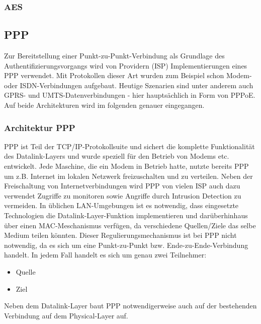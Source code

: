  
 \subsubsection{AES}
 \label{aes}
 
 \cite{paar09}
 
 \clearpage

\subsection{PPP}
Zur Bereitstellung einer Punkt-zu-Punkt-Verbindung als Grundlage des Authentifizierungsvorgangs
wird von Providern (\ac{ISP}) Implementierungen eines
\ac{PPP} verwendet. Mit Protokollen dieser Art wurden zum Beispiel schon Modem- oder ISDN-Verbindungen
aufgebaut. Heutige Szenarien sind unter anderem auch GPRS- und UMTS-Datenverbindungen -
hier hauptsächlich in
Form von \ac{PPPoE}. Auf beide Architekturen wird im folgenden
genauer eingegangen.



\subsubsection{Architektur PPP}
\ac{PPP} ist Teil der TCP/IP-Protokollsuite und sichert die komplette Funktionalität des
Datalink-Layers und wurde speziell für den Betrieb von Modems etc. entwickelt.
Jede Maschine, die ein Modem in Betrieb hatte, nutzte bereits \ac{PPP} um z.B.
Internet im lokalen Netzwerk freizuschalten und zu verteilen.
Neben der Freischaltung von Internetverbindungen wird \ac{PPP} von vielen \ac{ISP}
auch dazu verwendet Zugriffe zu monitoren sowie Angriffe durch Intrusion Detection zu vermeiden.
In üblichen \ac{LAN}-Umgebungen ist es notwendig, dass eingesetzte Technologien die Datalink-Layer-Funktion
implementieren und darüberhinhaus über einen MAC-Meschanismus verfügen, da verschiedene
Quellen/Ziele das selbe Medium teilen könnten. Dieser Regulierungsmechanismus ist bei \ac{PPP}
nicht notwendig, da es sich um eine Punkt-zu-Punkt bzw. Ende-zu-Ende-Verbindung handelt.
In jedem Fall handelt es sich um genau zwei Teilnehmer:
\begin{itemize}
	\item Quelle
	\item Ziel
\end{itemize}

Neben dem Datalink-Layer baut \ac{PPP} notwendigerweise auch auf der bestehenden Verbindung
auf dem Physical-Layer auf.

